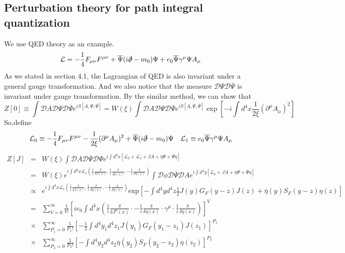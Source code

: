 \documentclass[cyan]{elegantnote}
\begin{document}
\subsection{Perturbation theory for path integral quantization}
\noindent
We use QED theory as an example.
\[\mathcal{L} = -\frac{1}{4}F_{\mu\nu}F^{\mu\nu} + \overline{\Psi} (i\slashed{\partial}-m_0) \Psi + e_0\overline{\Psi}\gamma^{\mu}\Psi A_{\mu}\]
As we stated in section 4.1, the Lagrangian of QED is also invariant under a general gauge transformation. And we also notice that the measure $\mathcal{D}\Psi \mathcal{D}\overline{\Psi}$ is invariant under gauge transformation. By the similar method, we can show that
\[Z[0] \equiv \int \mathcal{D}A \mathcal{D}\Psi \mathcal{D}\overline{\Psi}e^{iS[A,\Psi,\overline{\Psi}]} = W(\xi)\int \mathcal{D}A \mathcal{D}\Psi \mathcal{D}\overline{\Psi}e^{iS[A,\Psi,\overline{\Psi}]} \exp\left[ -i \int d^4x \frac{1}{2\xi} (\partial^{\mu}A_{\mu})^2\right] \]
So,define
\[\mathcal{L}_0 \equiv -\frac{1}{4}F_{\mu\nu}F^{\mu\nu} - \frac{1}{2\xi} (\partial^{\mu}A_{\mu})^2 + \overline{\Psi} (i\slashed{\partial}-m_0) \Psi \quad \mathcal{L}_1 \equiv e_0\overline{\Psi}\gamma^{\mu}\Psi A_{\mu}\]
\begin{eqnarray}
Z[J] &=& W(\xi) \int \mathcal{D}A \mathcal{D}\overline{\Psi} \mathcal{D}\Psi e^{i\int d^4x [\mathcal{L}_0 + \mathcal{L}_1 + JA + \overline{\eta}\Psi + \overline{\Psi}\eta]} \nonumber \\
&=& W(\xi) e^{i\int d^4x \mathcal{L}_1(\frac{1}{i} \frac{\delta}{\delta J(x)},\frac{1}{i}\frac{\delta}{\delta \overline{\eta}(x)},-\frac{1}{i}\frac{\delta}{\delta \eta(x)})} \int \mathcal{D}\phi \mathcal{D}\overline{\Psi} \mathcal{D}A e^{i\int d^4y [\mathcal{L}_0 + JA + \overline{\eta}\Psi + \overline{\Psi}\eta]} \nonumber \\
&\propto & e^{i\int d^4x \mathcal{L}_1(\frac{1}{i} \frac{\delta}{\delta J(x)},\frac{1}{i}\frac{\delta}{\delta \overline{\eta}(x)},-\frac{1}{i}\frac{\delta}{\delta \eta(x)})} \mathrm{exp} [- \int d^4y d^4z  \frac{1}{2} J(y)G_F(y-z)J(z) + \overline{\eta}(y)S_F(y-z)\eta(z)] \nonumber \\
& =& \sum_{V=0}^{\infty} \frac{1}{V!} [ie_0 \int d^4x (\frac{1}{i} \frac{\delta}{\delta J^{\mu}(x)} \cdot -\frac{1}{i}\frac{\delta}{\delta \eta(x)} \cdot \gamma^{\mu} \cdot  \frac{1}{i}\frac{\delta}{\delta \overline{\eta}(x)})]^V \nonumber \\
&\times & \sum_{P_1=0}^{\infty} \frac{1}{P_1!} [-\frac{1}{2} \int d^4y_1 d^4z_1 J(y_1)G_F(y_1-z_1)J(z_1)]^{P_1} \nonumber \\
&\times &  \sum_{P_2=0}^{\infty} \frac{1}{P_2!} [-\int d^4y_2 d^4z_2 \overline{\eta}(y_2)S_F(y_2-z_2)\eta(z_2)]^{P_2} \nonumber
\end{eqnarray}
\end{document}
